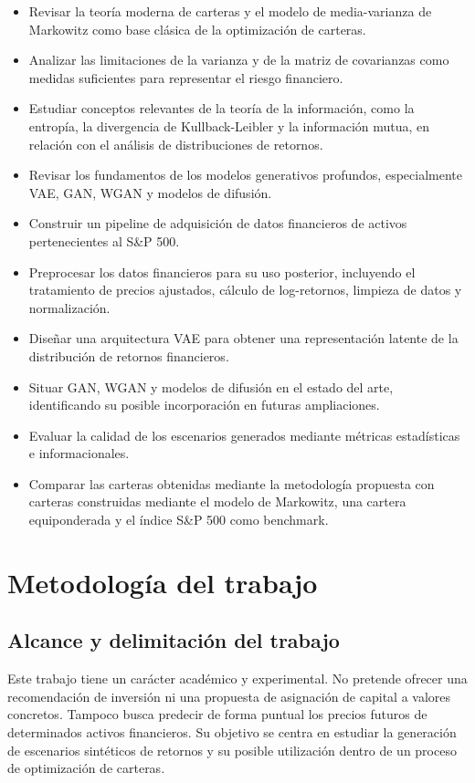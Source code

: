 \begin{itemize}
    \item Revisar la teoría moderna de carteras y el modelo de media-varianza de Markowitz como base clásica de la optimización de carteras.
    \item Analizar las limitaciones de la varianza y de la matriz de covarianzas como medidas suficientes para representar el riesgo financiero.
    \item Estudiar conceptos relevantes de la teoría de la información, como la entropía, la divergencia de Kullback-Leibler y la información mutua, en relación con el análisis de distribuciones de retornos.
    \item Revisar los fundamentos de los modelos generativos profundos, especialmente VAE, GAN, WGAN y modelos de difusión.
    \item Construir un pipeline de adquisición de datos financieros de activos pertenecientes al S\&P 500.
    \item Preprocesar los datos financieros para su uso posterior, incluyendo el tratamiento de precios ajustados, cálculo de log-retornos, limpieza de datos y normalización.
    \item Diseñar una arquitectura VAE para obtener una representación latente de la distribución de retornos financieros.
    \item Situar GAN, WGAN y modelos de difusión en el estado del arte, identificando su posible incorporación en futuras ampliaciones.
    \item Evaluar la calidad de los escenarios generados mediante métricas estadísticas e informacionales.
    \item Comparar las carteras obtenidas mediante la metodología propuesta con carteras construidas mediante el modelo de Markowitz, una cartera equiponderada y el índice S\&P 500 como benchmark.
\end{itemize}

\section{Metodología del trabajo}

\subsection{Alcance y delimitación del trabajo}

Este trabajo tiene un carácter académico y experimental. No pretende ofrecer una recomendación de inversión ni una propuesta de asignación de capital a valores concretos. Tampoco busca predecir de forma puntual los precios futuros de determinados activos financieros. Su objetivo se centra en estudiar la generación de escenarios sintéticos de retornos y su posible utilización dentro de un proceso de optimización de carteras.

